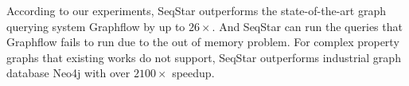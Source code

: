 According to our experiments, SeqStar outperforms the state-of-the-art graph querying system Graphflow by up to $26\times$.
And SeqStar can run the queries that Graphflow fails to run due to the out of memory problem.
For complex property graphs that existing works do not support,
SeqStar outperforms industrial graph database Neo4j with over $2100\times$ speedup.



